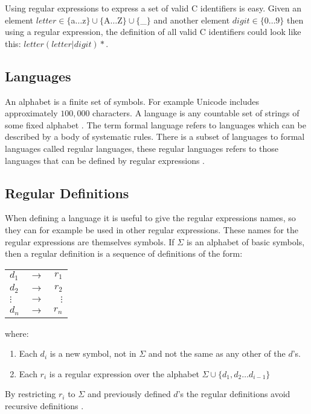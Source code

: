 \begin{example}\label{regexpEx}
Using regular expressions to express a set of valid C identifiers is easy.
Given an element $letter \in \{$a$ \dots $z$\} \cup \{$A$ \dots $Z$\} \cup 
\{$\_$\}$ and another element $digit \in \{0 \dots 9\}$ then using a regular
expression, the definition of all valid C identifiers 
could look like this: $letter (letter | digit)*$. 
\end{example}

\subsection{Languages}
An alphabet is a finite set of symbols. For example Unicode includes 
approximately $100,000$ characters. A language is any countable set of strings
of some fixed alphabet \cite{Aho2006}. The term formal language refers to
languages which can be described by a body of systematic rules. There is a
subset of languages to formal languages called regular languages, these regular
languages refers to those languages that can be defined by regular expressions
\cite{Ranta2012}.

\subsection{Regular Definitions}
When defining a language it is useful to give the regular expressions names, 
so they can for example be used in other regular expressions. These names for
the regular expressions are themselves symbols. If $\Sigma$ is an alphabet of 
basic symbols, then a regular definition is a sequence of definitions of the
form:
\begin{center}
\begin{tabular}{l c r}
$d_1$ & $\to$ & $r_1$\\
$d_2$ & $\to$ & $r_2$\\
$\vdots$ & $\to$ & $\vdots$\\
$d_n$ & $\to$ & $r_n$\\

\end{tabular}
\end{center}
where:
\begin{enumerate}
\item Each $d_i$ is a new symbol, not in $\Sigma$ and not the same as any other 
of the $d$'s.
\item Each $r_i$ is a regular expression over the alphabet $\Sigma  \cup \{d_1, 
d_2 \dots d_{i-1}\}$
\end{enumerate}
By restricting $r_i$ to $\Sigma$ and previously defined $d$'s the regular 
definitions avoid recursive definitions \cite{Aho2006}.

